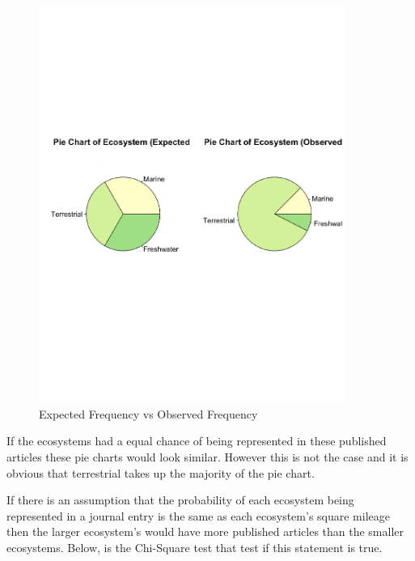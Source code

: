 \documentclass[
]{article}
\begin{document}
\begin{figure}
  \caption{Expected Frequency vs Observed Frequency}
    \includegraphics[width=10cm]{pie-eco-1.pdf}
\end{figure}

If the ecosystems had a equal chance of being represented in these
published articles these pie charts would look similar. However this is
not the case and it is obvious that terrestrial takes up the majority of
the pie chart.

If there is an assumption that the probability of each ecosystem being
represented in a journal entry is the same as each ecosystem's square
mileage then the larger ecosystem's would have more published articles
than the smaller ecosystems. Below, is the Chi-Square test that test if
this statement is true.
\end{document}
